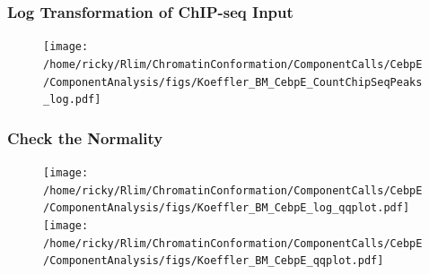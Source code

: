 \documentclass[notes]{beamer}
\begin{document}
\begin{frame}                                                                                                                        
    \frametitle{Log Transformation of ChIP-seq Input}
    \begin{figure}
        \texttt{[image: /home/ricky/Rlim/ChromatinConformation/ComponentCalls/CebpE/ComponentAnalysis/figs/Koeffler\_BM\_CebpE\_CountChipSeqPeaks\_log.pdf]}
    \end{figure}
\end{frame}

\begin{frame}                                                                                                                        
    \frametitle{Check the Normality}
    \begin{figure}
        \texttt{[image: /home/ricky/Rlim/ChromatinConformation/ComponentCalls/CebpE/ComponentAnalysis/figs/Koeffler\_BM\_CebpE\_log\_qqplot.pdf]}
        \texttt{[image: /home/ricky/Rlim/ChromatinConformation/ComponentCalls/CebpE/ComponentAnalysis/figs/Koeffler\_BM\_CebpE\_qqplot.pdf]}
    \end{figure}
\end{frame}
\end{document}
